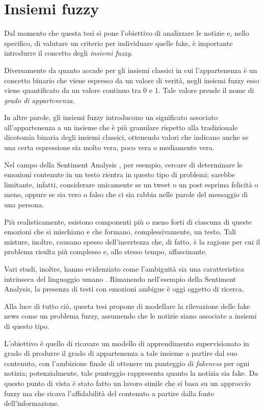 \documentclass[12pt]{report}
\theoremstyle{definition}
\begin{document}
\section{Insiemi fuzzy} \label{insiemifuzzy}
Dal momento che questa tesi si pone l'obiettivo di analizzare le notizie e, nello specifico, di valutare un criterio per individuare quelle fake, è importante introdurre il concetto degli \textit{insiemi fuzzy}.

Diversamente da quanto accade per gli insiemi classici in cui l'appartenenza  è un concetto binario che viene espresso da un valore di verità, negli insiemi fuzzy esso viene quantificato da un valore continuo tra 0 e 1.
Tale valore prende il nome di \textit{grado di appartenenza}.

In altre parole, gli insiemi fuzzy introducono un significato associato all'appartenenza a un insieme che è più granulare rispetto alla tradizionale dicotomia binaria degli insiemi classici, ottenendo valori che indicano anche se una certa espressione sia molto vera, poco vera o mediamente vera.

Nel campo della Sentiment Analysis \cite{18, 25}, per esempio, cercare di determinare le emozioni contenute in un testo rientra in questo tipo di problemi; sarebbe limitante, infatti, considerare unicamente se un tweet o un post esprima felicità o meno, oppure se sia vero o falso che ci sia rabbia nelle parole del messaggio di una persona.

Più realisticamente, esistono componenti più o meno forti di ciascuna di queste emozioni che si mischiano e che formano, complessivamente, un testo.
Tali misture, inoltre, causano spesso dell'incertezza che, di fatto, è la ragione per cui il problema risulta più complesso e, allo stesso tempo, affascinante.

Vari studi, inoltre, hanno evidenziato come l'ambiguità sia una caratteristica intrinseca del linguaggio umano \cite{26, 27}.
Rimanendo nell'esempio della Sentiment Analysis, la presenza di testi con emozioni ambigue è oggi oggetto di ricerca.

Alla luce di tutto ciò, questa tesi propone di modellare la rilevazione delle fake news come un problema fuzzy, assumendo che le notizie siano associate a insiemi di questo tipo.

L'obiettivo è quello di ricavare un modello di apprendimento supervisionato in grado di produrre il grado di appartenenza a tale insieme a partire dal suo contenuto, con l'ambizione finale di ottenere un punteggio di \textit{fakeness} per ogni notizia;
potenzialmente, tale punteggio rappresenta quanto la notizia sia fake. Da questo punto di vista è stato fatto un lavoro simile \cite{35} che si basa su un approccio fuzzy ma che ricava l'affidabilità del contenuto a partire dalla fonte dell'informazione.
\end{document}
